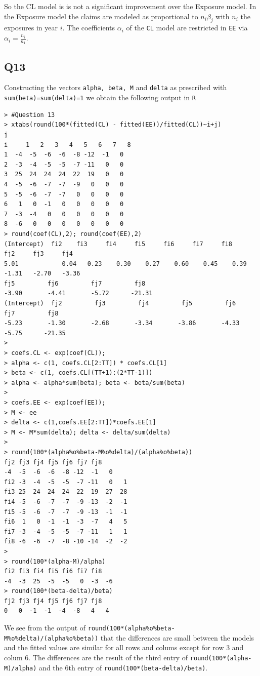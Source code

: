 \documentclass[11pt]{article}
\begin{document}
So the CL model is is not a significant improvement over the Exposure model. In the Exposure model the claims are modeled as proportional to $n_i \beta_j$ with $n_i$ the exposures in year $i$. The coefficients $\alpha_i$ of the \verb|CL| model are restricted in \verb|EE| via $\alpha_i = \frac{n_i}{n_1}$.

\subsection*{Q13}

Constructing the vectors \verb|alpha, beta, M| and \verb|delta| as prescribed with \verb|sum(beta)=sum(delta)=1| we obtain the following output in \verb|R|

\begin{verbatim}
> #Question 13
> xtabs(round(100*(fitted(CL) - fitted(EE))/fitted(CL))~i+j)
j
i     1   2   3   4   5   6   7   8
1  -4  -5  -6  -6  -8 -12  -1   0
2  -3  -4  -5  -5  -7 -11   0   0
3  25  24  24  24  22  19   0   0
4  -5  -6  -7  -7  -9   0   0   0
5  -5  -6  -7  -7   0   0   0   0
6   1   0  -1   0   0   0   0   0
7  -3  -4   0   0   0   0   0   0
8  -6   0   0   0   0   0   0   0
> round(coef(CL),2); round(coef(EE),2)
(Intercept)  fi2    fi3     fi4     fi5     fi6     fi7     fi8     fj2     fj3     fj4 
5.01	        0.04   0.23    0.30    0.27    0.60    0.45    0.39    -1.31   -2.70   -3.36 
fj5         fj6         fj7         fj8 
-3.90       -4.41       -5.72      -21.31 
(Intercept)  fj2         fj3         fj4         fj5         fj6         fj7         fj8 
-5.23       -1.30       -2.68       -3.34       -3.86       -4.33       -5.75      -21.35 
> 
> coefs.CL <- exp(coef(CL));
> alpha <- c(1, coefs.CL[2:TT]) * coefs.CL[1]
> beta <- c(1, coefs.CL[(TT+1):(2*TT-1)])
> alpha <- alpha*sum(beta); beta <- beta/sum(beta)
> 
> coefs.EE <- exp(coef(EE));
> M <- ee
> delta <- c(1,coefs.EE[2:TT])*coefs.EE[1]
> M <- M*sum(delta); delta <- delta/sum(delta)
> 
> round(100*(alpha%o%beta-M%o%delta)/(alpha%o%beta))
fj2 fj3 fj4 fj5 fj6 fj7 fj8
-4  -5  -6  -6  -8 -12  -1   0
fi2 -3  -4  -5  -5  -7 -11   0   1
fi3 25  24  24  24  22  19  27  28
fi4 -5  -6  -7  -7  -9 -13  -2  -1
fi5 -5  -6  -7  -7  -9 -13  -1  -1
fi6  1   0  -1  -1  -3  -7   4   5
fi7 -3  -4  -5  -5  -7 -11   1   1
fi8 -6  -6  -7  -8 -10 -14  -2  -2
> 
> round(100*(alpha-M)/alpha)
fi2 fi3 fi4 fi5 fi6 fi7 fi8 
-4  -3  25  -5  -5   0  -3  -6 
> round(100*(beta-delta)/beta)
fj2 fj3 fj4 fj5 fj6 fj7 fj8 
0   0  -1  -1  -4  -8   4   4 
\end{verbatim}
We see from the output of \verb|round(100*(alpha%o%beta-M%o%delta)/(alpha%o%beta))| that the differences are small between the models and the fitted values are similar for all rows and colums except for row 3 and colum 6. The differences are the result of the third entry of \verb|round(100*(alpha-M)/alpha)| and the 6th entry of \verb|round(100*(beta-delta)/beta)|.
\end{document}
